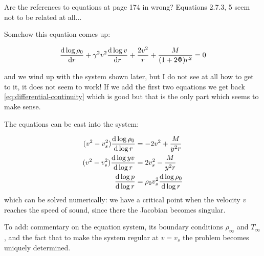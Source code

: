 \documentclass[main.tex]{subfiles}
\begin{document}
\begin{greenbox}
  Are the references to equations at page 174 in \cite{Nobili:2000} wrong? Equations 2.7.3, 5 seem not to be related at all...

  Somehow this equation comes up:

  \begin{equation}
    \dv{\log \rho_0 }{r} + \gamma^2 v^2 \dv{\log v }{r}  + \frac{2 v^2}{r} + \frac{M}{(1+2 \Phi) r^2} = 0
  \end{equation}

  and we wind up with the system shown later,
  but I do not see at all how to get to it, it does not seem to work!
  If we add the first two equations we get back \eqref{eq:differential-continuity} which is good but that is the only part which seems to make sense.
\end{greenbox}

The equations can be cast into the system:

\begin{subequations}
\begin{align}
  (v^2-v_s^2) \dv{\log \rho_0}{\log r} &= - 2v^2 + \frac{M}{y^2 r}  \\
  (v^2-v_s^2) \dv{\log yv }{\log r} &=  2v_s^2 - \frac{M}{y^2 r}  \\
  \dv{\log p }{\log r} &= \rho_0 v_s^2 \dv{\log \rho_0}{\log r }
\end{align}
\end{subequations}
which can be solved numerically: we have a critical point when the velocity \(v\) reaches the speed of sound, since there the Jacobian becomes singular.


\begin{greenbox}
  To add: commentary on the equation system, its boundary conditions \(\rho_\infty\) and \(T_\infty\), and the fact that to make the system regular at \(v = v_s\) the problem becomes uniquely determined.
\end{greenbox}
\end{document}
